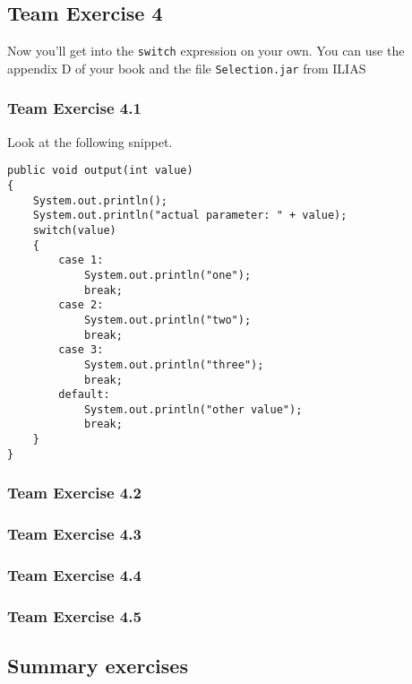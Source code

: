 \subsection{Team Exercise 4}
Now you'll get into the \lstinline{switch} expression on your own.
You can use the appendix D of your book and the file 
\verb!Selection.jar! from ILIAS

\subsubsection{Team Exercise 4.1}
Look at the following snippet.
\begin{lstlisting}
public void output(int value)
{
	System.out.println();
	System.out.println("actual parameter: " + value);
	switch(value)
	{
		case 1:
			System.out.println("one");
			break;
		case 2:
			System.out.println("two");
			break;
		case 3: 
			System.out.println("three");
			break;
		default:
			System.out.println("other value");
			break;
	}
}
\end{lstlisting}

\subsubsection{Team Exercise 4.2}



\subsubsection{Team Exercise 4.3}
\subsubsection{Team Exercise 4.4}
\subsubsection{Team Exercise 4.5}

\subsection{Summary exercises}

